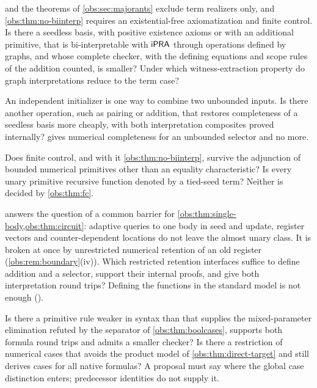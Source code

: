 \begin{question}
 and the theorems of \cref{obs:sec:majorants} exclude
term realizers only, and \cref{obs:thm:no-biinterp} requires an
existential-free axiomatization and finite control. Is there a seedless basis,
with positive existence axioms or with an additional primitive, that is
bi-interpretable with $\mathsf{iPRA}$ through operations defined by graphs, and whose
complete checker, with the defining equations and scope rules of the addition
counted, is smaller? Under which witness-extraction property do graph
interpretations reduce to the term case?
\end{question}

\begin{question}
An independent initializer is one way to combine two unbounded inputs. Is there
another operation, such as pairing or addition, that restores completeness of a
seedless basis more cheaply, with both interpretation composites proved
internally?  gives numerical completeness for an
unbounded selector and no more.
\end{question}

\begin{question}
Does finite control, and with it \cref{obs:thm:no-biinterp}, survive the
adjunction of bounded numerical primitives other than an equality
characteristic? Is every unary primitive recursive function denoted by a
tied-seed term? Neither is decided by \cref{obs:thm:fc}.
\end{question}

\begin{question}
 answers the question of a common barrier for
\cref{obs:thm:single-body,obs:thm:circuit}: adaptive queries to one body in
seed and update, register vectors and counter-dependent locations do not leave
the almost unary class. It is broken at once by unrestricted numerical
retention of an old register (\cref{obs:rem:boundary}(iv)). Which restricted
retention interfaces suffice to define addition and a selector, support their
internal proofs, and give both interpretation round trips? Defining the
functions in the standard model is not enough ().
\end{question}

\begin{question}
Is there a primitive rule weaker in syntax than  that
supplies the mixed-parameter elimination refuted by the separator of
\cref{obs:thm:boolcases}, supports both formula round trips and admits a
smaller checker? Is there a restriction of numerical cases that avoids the
product model of \cref{obs:thm:direct-target} and still derives cases for all
native formulas? A proposal must say where the global case distinction enters;
predecessor identities do not supply it.
\end{question}

